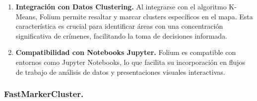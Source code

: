 \documentclass{article}
\begin{document}
\begin{itemize}
\begin{enumerate}
                    \item \textbf{Integración con Datos Clustering.} Al integrarse con el algoritmo K-Means, Folium permite resaltar y marcar clusters específicos en el mapa. Esta característica es crucial para identificar áreas con una concentración significativa de crímenes, facilitando la toma de decisiones informada.

                    \item \textbf{Compatibilidad con Notebooks Jupyter.} Folium es compatible con entornos como Jupyter Notebooks, lo que facilita su incorporación en flujos de trabajo de análisis de datos y presentaciones visuales interactivas.
                \end{enumerate}
            \end{itemize}
        \subsubsection{FastMarkerCluster.}
\end{document}

